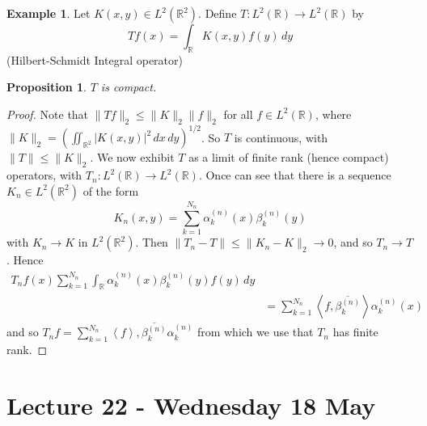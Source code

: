 \documentclass[10pt, oneside, reqno]{amsart}
\theoremstyle{plain}%
\newtheorem{prop}[thm]{Proposition}
\theoremstyle{definition}
\newtheorem{exmp}[thm]{Example}
\theoremstyle{remark}
\newcommand{\R}{\mathbb{R}}
\newcommand{\iprod}[1]{\left\langle #1 \right\rangle}
\begin{document}
\begin{exmp}
    Let $K(x, y) \in L^2(\R^2)$.  Define $T : L^2(\R) \rightarrow  L^2(\R)$ by \[
        Tf(x) = \int_\R K(x, y) f(y) \, dy
    \] (Hilbert-Schmidt Integral operator)
\end{exmp}
\begin{prop}
    $T$ is compact.  
\end{prop}
\begin{proof}
    Note that $\| Tf \|_2 \leq \| K \|_2 \| f \|_2$ for all $f \in L^2(\R)$, where $\| K \|_2 = \left( \iint_{\R^2} |K(x, y)|^2 \, dx \, dy \right)^{1/2}$.  So $T$ is continuous, with $\| T \| \leq \| K \|_2$.  We now exhibit $T$ as a limit of finite rank (hence compact) operators, with $T_n : L^2(\R) \rightarrow L^2(\R)$.  Once can see that there is a sequence $K_n \in L^2(\R^2)$ of the form \[
        K_n(x, y) = \sum_{k=1}^{N_n} \alpha_k^{(n)}(x) \beta_{k}^{(n)}(y)
    \] with $K_n \rightarrow K$ in $L^2(\R^2)$.  Then $\| T_n - T \| \leq \| K_n - K \|_2 \rightarrow 0$, and so $T_n \rightarrow T$.  Hence 
    \begin{align*}
        T_n f(x) \sum_{k=1}^{N_n} \int_\R \alpha_k^{(n)}(x) \beta_k^{(n)}(y) f(y) \, dy \\
        &= \sum_{k=1}^{N_n} \iprod{f, \overline{\beta_k^{(n)}}} \alpha_k^{(n)} (x) 
    \end{align*}  and so $T_nf = \sum_{k=1}^{N_n} \iprod f, \overline{\beta_k^{(n)}} \alpha_k^{(n)}$ from which we use that $T_n$ has finite rank.  
\end{proof}




\section{Lecture 22 - Wednesday 18 May} %
\label{sec:lecture_22_wednesday_18_may}
\end{document}
